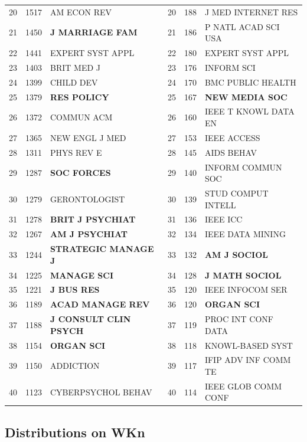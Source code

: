 \documentclass[11pt]{article} %
\begin{document}
\begin{table}
\begin{center}
\begin{tabular}{c|r|l||c|r|l}
20	&1517	& AM ECON REV				&  20	&188	&J MED INTERNET RES		   \\
21	&1450	& \textbf{J MARRIAGE FAM}		&  21	&186	&P NATL ACAD SCI USA		   \\
22	&1441	& EXPERT SYST APPL			&  22	&180	&EXPERT SYST APPL		   \\
23	&1403	& BRIT MED J				&  23	&176	&INFORM SCI			   \\
24	&1399	& CHILD DEV				&  24	&170	&BMC PUBLIC HEALTH		   \\
25	&1379	& \textbf{RES POLICY}			&  25	&167	&\textbf{NEW MEDIA SOC}			   \\
26	&1372	& COMMUN ACM				&  26	&160	&IEEE T KNOWL DATA EN		   \\
27	&1365	& NEW ENGL J MED			& 27	&153	&IEEE ACCESS			   \\
28	&1311	& PHYS REV E				&  28	&145	&AIDS BEHAV			   \\
29	&1287	& \textbf{SOC FORCES}			&  29	&140	&INFORM COMMUN SOC		   \\
30	&1279	& GERONTOLOGIST				&  30	&139	&STUD COMPUT INTELL		   \\
31	&1278	& \textbf{BRIT J PSYCHIAT}		&  31	&136	&IEEE ICC			   \\
32	&1267	&\textbf{AM J PSYCHIAT}		&  32	&134	&IEEE DATA MINING		   \\
33	&1244	& \textbf{STRATEGIC MANAGE J}		&  33	&132	&\textbf{AM J SOCIOL}			   \\
34	&1225	& \textbf{MANAGE SCI}		&  34	&128	&\textbf{J MATH SOCIOL}	   \\
35	&1221	& \textbf{J BUS RES}		&  35	&120	&IEEE INFOCOM SER		   \\
36	&1189	&\textbf{ACAD MANAGE REV}	&  36	&120	&\textbf{ORGAN SCI}		   \\
37	&1188	&\textbf{J CONSULT CLIN PSYCH}	& 37	&119	&PROC INT CONF DATA		   \\
38	&1154	&\textbf{ORGAN SCI}		&  38	&118	&KNOWL-BASED SYST		   \\
39	&1150	& ADDICTION				&  39	&117	&IFIP ADV INF COMM TE		   \\
40	&1123	& CYBERPSYCHOL BEHAV			&  40	&114	&IEEE GLOB COMM CONF		   \\ \hline 
\end{tabular}
\end{center}
\end{table}


\subsection{Distributions on WKn}
\end{document}
